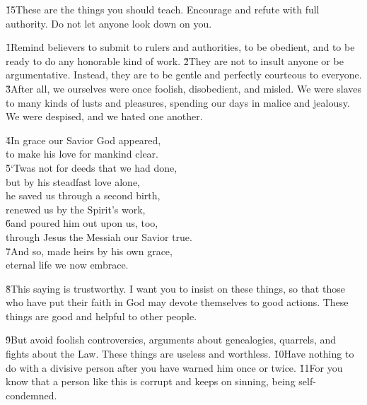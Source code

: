 \v{15}These are the things you should teach. Encourage and refute with full authority. Do not let anyone look down on you.

\v{1}Remind believers to submit to rulers and authorities, to be obedient, and to be ready to do any honorable kind of work. \v{2}They are not to insult anyone or be argumentative. Instead, they are to be gentle and perfectly courteous to everyone. \v{3}After all, we ourselves were once foolish, disobedient, and misled. We were slaves to many kinds of lusts and pleasures, spending our days in malice and jealousy. We were despised, and we hated one another.

\begin{poetry}
\poeml \v{4}In grace our Savior God appeared, \\
\poemll    to make his love for mankind clear. \\
\poeml \v{5}`Twas not for deeds that we had done, \\
\poemll    but by his steadfast love alone, \\
\poeml he saved us through a second birth, \\
\poemll    renewed us by the Spirit's work, \\
\poeml \v{6}and poured him out upon us, too, \\
\poemll    through Jesus the Messiah our Savior true. \\
\poeml \v{7}And so, made heirs by his own grace, \\
\poemll    eternal life we now embrace.
\end{poetry}

\v{8}This saying is trustworthy. I want you to insist on these things, so that those who have put their faith in God may devote themselves to good actions. These things are good and helpful to other people.

\v{9}But avoid foolish controversies, arguments about genealogies, quarrels, and fights about the Law. These things are useless and worthless. \v{10}Have nothing to do with a divisive person after you have warned him once or twice. \v{11}For you know that a person like this is corrupt and keeps on sinning, being self-condemned.

